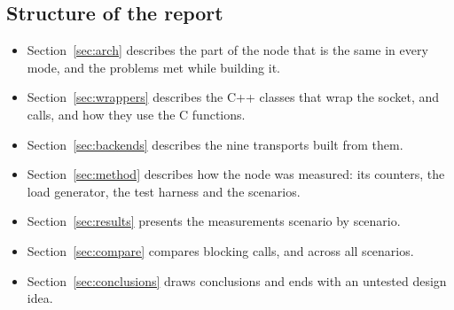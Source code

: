 \subsection{Structure of the report}

\begin{itemize}
  \item Section~\ref{sec:arch} describes the part of the node that is the same in
        every mode, and the problems met while building it.
  \item Section~\ref{sec:wrappers} describes the C++ classes that wrap the socket,
         and  calls, and how they use the C functions.
  \item Section~\ref{sec:backends} describes the nine transports built from them.
  \item Section~\ref{sec:method} describes how the node was measured: its counters,
        the load generator, the test harness and the scenarios.
  \item Section~\ref{sec:results} presents the measurements scenario by scenario.
  \item Section~\ref{sec:compare} compares blocking calls,  and
         across all scenarios.
  \item Section~\ref{sec:conclusions} draws conclusions and ends with an untested
        design idea.
\end{itemize}
